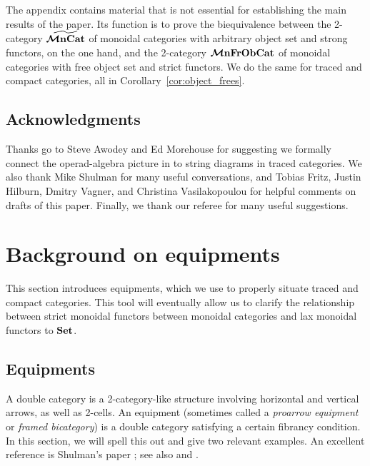 \documentclass[11pt,oneside,article]{memoir}
\begin{document}
The appendix contains material that is not essential for establishing the main results of the paper. Its function is to prove the
biequivalence between the 2-category $\widetilde{\bm{\mathcal{M}}\mathbf{nCat}}$ of monoidal categories with arbitrary object
set and strong functors, on the one hand, and the 2-category $\bm{\mathcal{M}}\mathbf{nFrObCat}$ of monoidal categories
with free object set and strict functors. We do the same for traced and compact categories, all in
Corollary~\ref{cor:object_frees}.

\section*{Acknowledgments}

Thanks go to Steve Awodey and Ed Morehouse for suggesting we formally connect the operad-algebra
picture in \cite{RupelSpivak} to string diagrams in traced categories. We also thank Mike Shulman
for many useful conversations, and Tobias Fritz, Justin Hilburn, Dmitry Vagner, and Christina
Vasilakopoulou for helpful comments on drafts of this paper. Finally, we thank our referee for many
useful suggestions.

\chapter{Background on equipments}
  \label{chap:background_equipments}

This section introduces equipments, which we use to properly situate traced and compact categories.
This tool will eventually allow us to clarify the relationship between strict monoidal functors
between monoidal categories and lax monoidal functors to $\mathbf{Set}$.

\section{Equipments}
  \label{sec:equipments}

A double category is a 2-category-like structure involving horizontal and vertical arrows, as well
as 2-cells. An equipment (sometimes called a \emph{proarrow equipment} or \emph{framed bicategory})
is a double category satisfying a certain fibrancy condition. In this section, we will spell this
out and give two relevant examples. An excellent reference is Shulman's paper \cite{Shulman}; see
also \cite{Wood1} and \cite{Wood2}.
\end{document}

